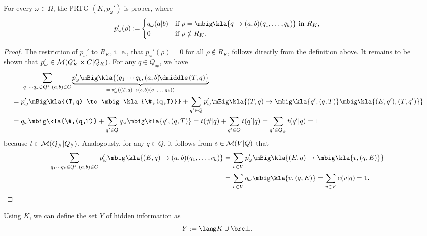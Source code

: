\begin{lemma}
 For every $\omega\in\Omega$, the PRTG $(K,p_\omega')$ is proper, where
 \[
  p'_\omega(\rho) := \begin{cases}
   q_\omega(a|b) & \text{if } \rho=\mbig\kla{q\to(a,b)(q_1,\ldots,q_k)}\isin R_K, \\
   0 & \text{if } \rho\notin R_K.
  \end{cases}
 \]
\end{lemma}

\begin{proof}
 The restriction of $p_\omega'$ to $R_K$, i.~e., that $p_\omega'(\rho)=0$ for all
 $\rho\notin R_K$, follows directly from the definition above. It remains to be shown
 that $p_\omega'\in\mathcal M(Q_K^*\times C|Q_K)$. For any $q\in Q_\#$, we have
 \begin{align*}
  &\hspace{1.5em} \sum_{q_1\cdots q_k\in Q^*,(a,b)\in C} \underbrace{p_\omega'\mBig\kla{(q_1\cdots q_k,(a,b)\npipe(T,q)}}_{=\,p_\omega'((T,q)\to(a,b)(q_1,\ldots,q_k))} \\
  &= p_\omega'\mBig\kla{(T,q) \to \mbig\kla{\#,(q,T)}} + \sum_{q'\in Q} p_\omega'\mBig\kla{(T,q) \to \mbig\kla{q',(q,T)}\mbig\kla{(E,q'),(T,q')}} \\
  &= q_\omega\mbig\kla{\#,(q,T)} + \sum_{q'\in Q} q_\omega\mbig\kla{q',(q,T)} = t(\#|q) + \sum_{q'\in Q} t(q'|q) = \sum_{q'\in Q_\#} t(q'|q) = 1
 \end{align*}
 \clearpage
 because $t\in\mathcal M(Q_\#|Q_\#)$. Analogously, for any $q\in Q$, it follows from $e\in\mathcal M(V|Q)$ that
 \begin{align*}
  \sum_{q_1\cdots q_k\in Q^*,(a,b)\in C} p_\omega'\mbig\kla{(E,q)\to(a,b)(q_1,\ldots,q_k)}
  &= \sum_{v\in V} p_\omega'\mBig\kla{(E,q) \to \mbig\kla{v,(q,E)}} \\
  &= \sum_{v\in V} q_\omega\mbig\kla{v,(q,E)} = \sum_{v\in V} e(v|q) = 1.
  \qedhere
 \end{align*}
\end{proof}

Using $K$, we can define the set $Y$ of hidden information as
\[
 Y := \lang K \cup \brc\bot.
\]

